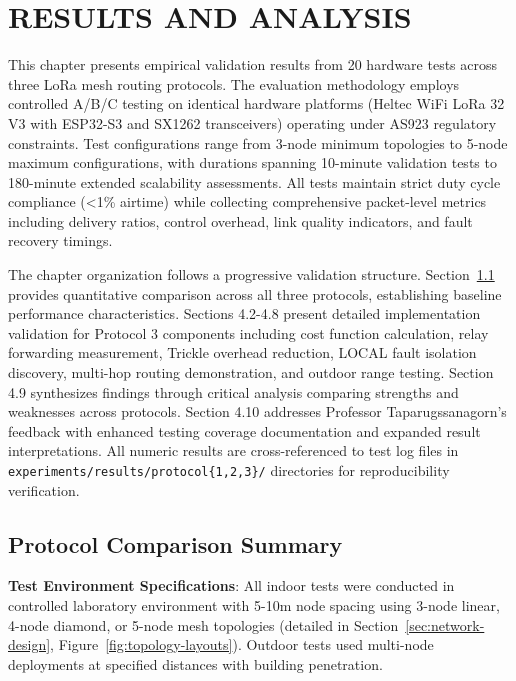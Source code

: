 \setlength{\parindent}{0in}
\setlength{\parskip}{0mm}
\setlength{\baselineskip}{1.6em}

\chapter{RESULTS AND ANALYSIS}
\label{chap:results}

This chapter presents empirical validation results from 20 hardware tests across three LoRa mesh routing protocols. The evaluation methodology employs controlled A/B/C testing on identical hardware platforms (Heltec WiFi LoRa 32 V3 with ESP32-S3 and SX1262 transceivers) operating under AS923 regulatory constraints. Test configurations range from 3-node minimum topologies to 5-node maximum configurations, with durations spanning 10-minute validation tests to 180-minute extended scalability assessments. All tests maintain strict duty cycle compliance (<1\% airtime) while collecting comprehensive packet-level metrics including delivery ratios, control overhead, link quality indicators, and fault recovery timings.

The chapter organization follows a progressive validation structure. Section~\ref{sec:protocol-comparison} provides quantitative comparison across all three protocols, establishing baseline performance characteristics. Sections 4.2-4.8 present detailed implementation validation for Protocol 3 components including cost function calculation, relay forwarding measurement, Trickle overhead reduction, LOCAL fault isolation discovery, multi-hop routing demonstration, and outdoor range testing. Section 4.9 synthesizes findings through critical analysis comparing strengths and weaknesses across protocols. Section 4.10 addresses Professor Taparugssanagorn's feedback with enhanced testing coverage documentation and expanded result interpretations. All numeric results are cross-referenced to test log files in \texttt{experiments/results/protocol\{1,2,3\}/} directories for reproducibility verification.

\section{Protocol Comparison Summary}
\label{sec:protocol-comparison}

\textbf{Test Environment Specifications}: All indoor tests were conducted in controlled laboratory environment with 5-10m node spacing using 3-node linear, 4-node diamond, or 5-node mesh topologies (detailed in Section~\ref{sec:network-design}, Figure~\ref{fig:topology-layouts}). Outdoor tests used multi-node deployments at specified distances with building penetration.

